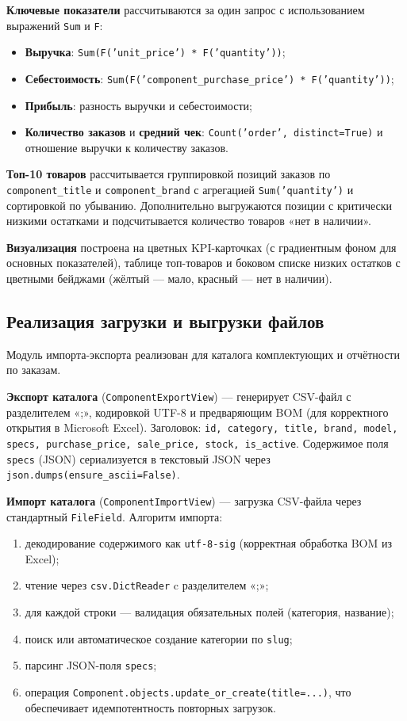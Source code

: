 \textbf{Ключевые показатели} рассчитываются за один запрос с использованием выражений \texttt{Sum} и \texttt{F}:
\begin{itemize}
    \item \textbf{Выручка}: \texttt{Sum(F('unit\_price') * F('quantity'))};
    \item \textbf{Себестоимость}: \texttt{Sum(F('component\_\allowbreak purchase\_price') * F('quantity'))};
    \item \textbf{Прибыль}: разность выручки и себестоимости;
    \item \textbf{Количество заказов} и \textbf{средний чек}: \texttt{Count('order', distinct=True)} и отношение выручки к количеству заказов.
\end{itemize}

\textbf{Топ-10 товаров} рассчитывается группировкой позиций заказов по \texttt{component\_\allowbreak title} и \texttt{component\_\allowbreak brand} с агрегацией \texttt{Sum('quantity')} и сортировкой по убыванию. Дополнительно выгружаются позиции с критически низкими остатками и подсчитывается количество товаров «нет в наличии».

\textbf{Визуализация} построена на цветных KPI-карточках (с градиентным фоном для основных показателей), таблице топ-товаров и боковом списке низких остатков с цветными бейджами (жёлтый --- мало, красный --- нет в наличии).

\subsection{Реализация загрузки и выгрузки файлов}

Модуль импорта-экспорта реализован для каталога комплектующих и отчётности по заказам.

\textbf{Экспорт каталога} (\texttt{ComponentExportView}) --- генерирует CSV-файл с разделителем «;», кодировкой UTF-8 и предваряющим BOM (для корректного открытия в Microsoft Excel). Заголовок: \texttt{id, category, title, brand, model, specs, purchase\_price, sale\_price, stock, is\_active}. Содержимое поля \texttt{specs} (JSON) сериализуется в текстовый JSON через \texttt{json.dumps(ensure\_ascii=False)}.

\textbf{Импорт каталога} (\texttt{ComponentImportView}) --- загрузка CSV-файла через стандартный \texttt{FileField}. Алгоритм импорта:
\begin{enumerate}
    \item декодирование содержимого как \texttt{utf-8-sig} (корректная обработка BOM из Excel);
    \item чтение через \texttt{csv.DictReader} c разделителем «;»;
    \item для каждой строки --- валидация обязательных полей (категория, название);
    \item поиск или автоматическое создание категории по \texttt{slug};
    \item парсинг JSON-поля \texttt{specs};
    \item операция \texttt{Component.objects.update\_or\_create(title=...)}, что обеспечивает идемпотентность повторных загрузок.
\end{enumerate}

